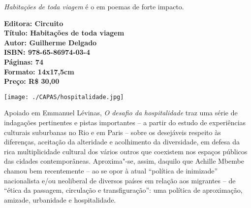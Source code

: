 \hspace*{-7cm}\hrulefill\hspace*{-7cm}

\medskip

\noindent{}\textit{Habitações de toda viagem} é o  em poemas de forte impacto.

%
%
%
%
%
% 


\vfill

\hspace*{-.4cm}\begin{minipage}[c]{1\linewidth}
\small\textbf{
\hspace*{-.1cm}Editora: Circuito\\
Título: Habitações de toda viagem\\
Autor: Guilherme Delgado\\ 
ISBN: 978-65-86974-03-4\\
Páginas: 74\\
Formato: 14x17,5cm\\
Preço: R\$ 30,00\\
}
\end{minipage}


\pagebreak %


\begin{center}
\hspace*{-3.6cm}
\hspace*{3.1cm}\texttt{[image: ./CAPAS/hospitalidade.jpg]}
\end{center}

\hspace*{-7cm}\hrulefill\hspace*{-7cm}

\medskip

\noindent{}Apoiado em Emmanuel Lévinas, \textit{O desafio da hospitalidade} traz uma série de indagações pertinentes e pistas importantes – a partir do estudo de experiências culturais suburbanas no Rio e em Paris – sobre os desejáveis respeito às diferenças, aceitação da alteridade e acolhimento da diversidade, em defesa da rica multiplicidade cultural dos vários outros que coexistem nos espaços públicos das cidades contemporâneas. Aproxima"-se, assim, daquilo que Achille Mbembe chamou bem recentemente – ao se opor à atual “política de inimizade” nacionalista e/ou neoliberal de diversos países em relação aos migrantes – de “ética da passagem, circulação e transfiguração”: uma política de aproximação, amizade, urbanidade e hospitalidade. 

